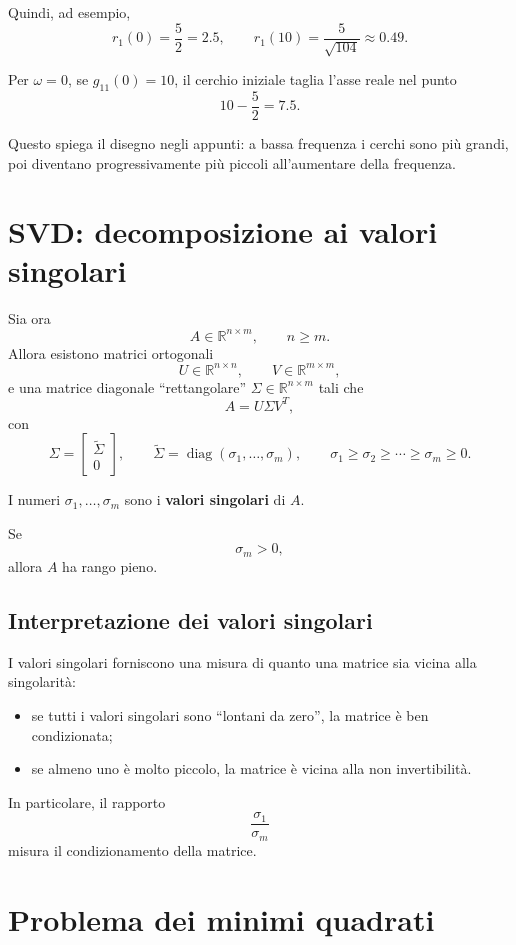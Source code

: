 Quindi, ad esempio,
\[
r_1(0)=\frac{5}{2}=2.5,
\qquad
r_1(10)=\frac{5}{\sqrt{104}}\approx 0.49.
\]

Per \(\omega=0\), se \(g_{11}(0)=10\), il cerchio iniziale taglia l'asse reale nel punto
\[
10-\frac{5}{2}=7.5.
\]

Questo spiega il disegno negli appunti: a bassa frequenza i cerchi sono più grandi, poi diventano progressivamente più piccoli all'aumentare della frequenza.

\section{SVD: decomposizione ai valori singolari}

Sia ora
\[
A\in\mathbb{R}^{n\times m},
\qquad n\ge m.
\]
Allora esistono matrici ortogonali
\[
U\in\mathbb{R}^{n\times n},
\qquad
V\in\mathbb{R}^{m\times m},
\]
e una matrice diagonale ``rettangolare'' \(\Sigma\in\mathbb{R}^{n\times m}\) tali che
\[
A=U\Sigma V^T,
\]
con
\[
\Sigma=
\begin{bmatrix}
\widetilde\Sigma\\
0
\end{bmatrix},
\qquad
\widetilde\Sigma=
\operatorname{diag}(\sigma_1,\dots,\sigma_m),
\qquad
\sigma_1\ge \sigma_2\ge \cdots \ge \sigma_m\ge 0.
\]

I numeri \(\sigma_1,\dots,\sigma_m\) sono i \textbf{valori singolari} di \(A\).

Se
\[
\sigma_m>0,
\]
allora \(A\) ha rango pieno.

\subsection{Interpretazione dei valori singolari}

I valori singolari forniscono una misura di quanto una matrice sia vicina alla singolarità:

\begin{itemize}
    \item se tutti i valori singolari sono ``lontani da zero'', la matrice è ben condizionata;
    \item se almeno uno è molto piccolo, la matrice è vicina alla non invertibilità.
\end{itemize}

In particolare, il rapporto
\[
\frac{\sigma_1}{\sigma_m}
\]
misura il condizionamento della matrice.

\section{Problema dei minimi quadrati}

